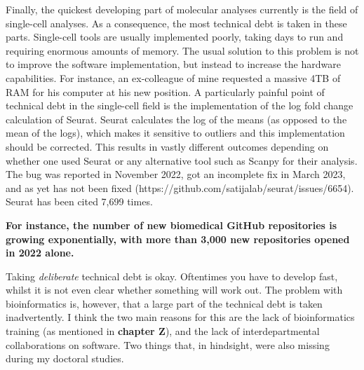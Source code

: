 Finally, the quickest developing part of molecular analyses currently is the field of single-cell analyses. As a consequence, the most technical debt is taken in these parts. Single-cell tools are usually implemented poorly, taking days to run and requiring enormous amounts of memory. The usual solution to this problem is not to improve the software implementation, but instead to increase the hardware capabilities. For instance, an ex-colleague of mine requested a massive 4TB of RAM for his computer at his new position. A particularly painful point of technical debt in the single-cell field is the implementation of the log fold change calculation of Seurat. Seurat calculates the log of the means (as opposed to the mean of the logs), which makes it sensitive to outliers and this implementation should be corrected. This results in vastly different outcomes depending on whether one used Seurat or any alternative tool such as Scanpy for their analysis. The bug was reported in November 2022, got an incomplete fix in March 2023, and as yet has not been fixed (https://github.com/satijalab/seurat/issues/6654). Seurat has been cited 7,699 times\cite{Butler2018}.

\textbf{For instance, the number of new biomedical GitHub repositories is growing exponentially, with more than 3,000 new repositories opened in 2022 alone\cite{Patel2023}.}

Taking \textit{deliberate} technical debt is okay. Oftentimes you have to develop fast, whilst it is not even clear whether something will work out. The problem with bioinformatics is, however, that a large part of the technical debt is taken inadvertently. I think the two main reasons for this are the lack of bioinformatics training (as mentioned in \textbf{chapter Z}), and the lack of interdepartmental collaborations on software. Two things that, in hindsight, were also missing during my doctoral studies. 

